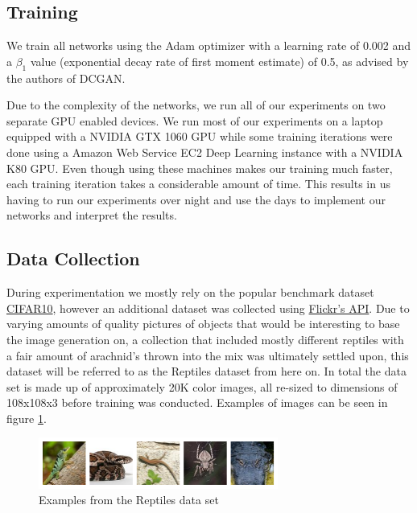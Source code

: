 \subsection{Training}
We train all networks using the Adam optimizer \cite{2014arXiv1412.6980K} with a learning rate of 0.002 and a $\beta_1$ value (exponential decay rate of first moment estimate) of 0.5, as advised by the authors of DCGAN.

Due to the complexity of the networks, we run all of our experiments on two separate GPU enabled devices. We run most of our experiments on a laptop equipped with a NVIDIA GTX 1060 GPU while some training iterations were done using a Amazon Web Service EC2 Deep Learning instance with a NVIDIA K80 GPU. Even though using these machines makes our training much faster, each training iteration takes a considerable amount of time. This results in us having to run our experiments over night and use the days to implement our networks and interpret the results. 

\subsection{Data Collection}

During experimentation we mostly rely on the popular benchmark dataset \href{https://www.cs.toronto.edu/~kriz/cifar.html}{CIFAR10}, however an additional dataset was collected using \href{https://www.flickr.com/services/api/}{Flickr's API}. Due to varying amounts of quality pictures of objects that would be interesting to base the image generation on, a collection that included mostly different reptiles with a fair amount of arachnid's thrown into the mix was ultimately settled upon, this dataset will be referred to as the Reptiles dataset from here on. In total the data set is made up of approximately 20K color images, all re-sized to dimensions of 108x108x3 before training was conducted. Examples of images can be seen in figure \ref{fig:reptiles}.%
\begin{figure}[H]
\centering
\includegraphics[width=0.7\textwidth]{figures/reptiles.png}
\caption{Examples from the Reptiles data set}
\label{fig:reptiles}
\end{figure}